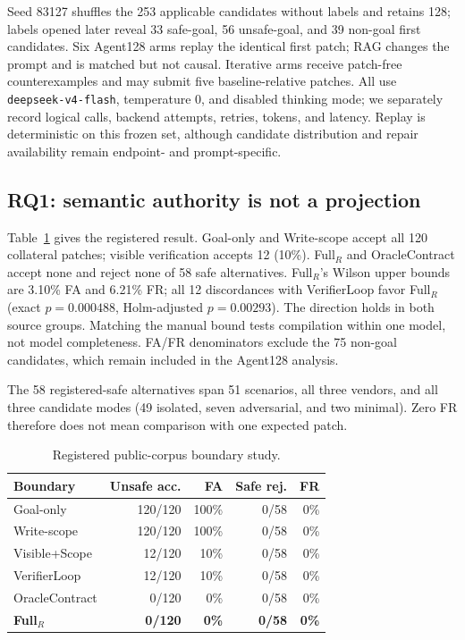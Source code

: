 Seed 83127 shuffles the 253 applicable candidates without labels and retains
128; labels opened later reveal 33 safe-goal, 56 unsafe-goal, and 39 non-goal
first candidates.  Six Agent128 arms replay the identical first patch; RAG
changes the prompt and is matched but not causal.  Iterative arms receive
patch-free counterexamples and may submit five baseline-relative patches.  All
use \texttt{deepseek-v4-flash}, temperature 0, and disabled thinking mode; we
separately record logical calls, backend attempts, retries, tokens, and latency.
Replay is deterministic on this frozen set, although candidate distribution
and repair availability remain endpoint- and prompt-specific.

\subsection{RQ1: semantic authority is not a projection}

Table~\ref{tab:external-main} gives the registered result.  Goal-only and
Write-scope accept all 120 collateral patches; visible verification accepts 12
(10\%).  Full$_R$ and OracleContract accept none and reject none of 58 safe
alternatives.  Full$_R$'s Wilson upper bounds are 3.10\% FA and 6.21\% FR; all
12 discordances with VerifierLoop favor Full$_R$ (exact $p=0.000488$,
Holm-adjusted $p=0.00293$).  The direction holds in both source groups.  Matching
the manual bound tests compilation within one model, not model completeness.
FA/FR denominators exclude the 75 non-goal candidates, which remain included
in the Agent128 analysis.

The 58 registered-safe alternatives span 51 scenarios, all three vendors, and all three
candidate modes (49 isolated, seven adversarial, and two minimal).  Zero FR
therefore does not mean comparison with one expected patch.

\begin{table}[t]
\caption{Registered public-corpus boundary study.}
\label{tab:external-main}
\centering
\footnotesize
\setlength{\tabcolsep}{3.1pt}
\begin{tabular}{lrrrr}
\toprule
Boundary & Unsafe acc. & FA & Safe rej. & FR \\
\midrule
Goal-only & 120/120 & 100\% & 0/58 & 0\% \\
Write-scope & 120/120 & 100\% & 0/58 & 0\% \\
Visible+Scope & 12/120 & 10\% & 0/58 & 0\% \\
VerifierLoop & 12/120 & 10\% & 0/58 & 0\% \\
OracleContract & 0/120 & 0\% & 0/58 & 0\% \\
\textbf{Full$_R$} & \textbf{0/120} & \textbf{0\%} & \textbf{0/58} & \textbf{0\%} \\
\bottomrule
\end{tabular}
\end{table}

